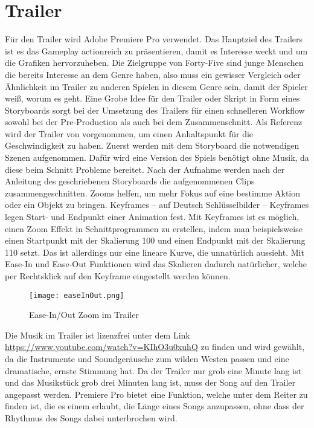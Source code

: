 
\section{Trailer}\label{sec:trailer}

\renewcommand{\kapitelautor}{Autor: Markus Böheim}

Für den Trailer wird Adobe Premiere Pro verwendet.
Das Hauptziel des Trailers
ist es das Gameplay actionreich zu präsentieren, damit es Interesse weckt und um die Grafiken hervorzuheben.
Die Zielgruppe von Forty-Five sind junge Menschen die bereits Interesse an dem Genre haben, also muss ein gewisser
Vergleich oder Ähnlichkeit im Trailer zu anderen Spielen in diesem Genre sein, damit der Spieler weiß, worum es geht.
Eine Grobe Idee für den Trailer oder Skript in Form eines Storyboards sorgt bei der Umsetzung des Trailers für einen
schnelleren Workflow sowohl bei der Pre-Production als auch bei dem Zusammenschnitt.
Als Referenz wird der Trailer von  vorgenommen, um einen Anhaltspunkt für die Geschwindigkeit zu haben.
Zuerst werden mit dem Storyboard die notwendigen Szenen aufgenommen.
Dafür wird eine Version des Spiels benötigt ohne Musik, da diese beim Schnitt Probleme bereitet.
Nach der Aufnahme werden nach der Anleitung des geschriebenen Storyboards die aufgenommenen Clips zusammengeschnitten.
Zooms helfen, um mehr Fokus auf eine bestimme Aktion oder ein Objekt zu bringen.
Keyframes – auf Deutsch Schlüsselbilder – Keyframes legen Start- und Endpunkt einer Animation fest.
Mit Keyframes ist es möglich, einen Zoom Effekt in Schnittprogrammen zu erstellen, indem man beispielsweise einen Startpunkt mit der Skalierung 100 und einen Endpunkt mit der Skalierung 110 setzt.
Das ist allerdings nur eine lineare Kurve, die unnatürlich aussieht.
Mit Ease-In und Ease-Out Funktionen wird das Skalieren dadurch natürlicher, welche per Rechtsklick auf den Keyframe eingestellt werden können.

\begin{figure}[H]
    \centering
    \texttt{[image: easeInOut.png]}
    \caption{Ease-In/Out Zoom im Trailer}
\end{figure}

Die Musik im Trailer ist lizenzfrei unter dem Link \url{https://www.youtube.com/watch?v=KIhO3u0xuhQ} zu finden und wird gewählt, da die Instrumente und Soundgeräusche zum wilden Westen passen und eine dramatische, ernste Stimmung hat. Da der Trailer nur grob eine Minute lang ist und das Musikstück grob drei Minuten lang ist, muss der Song auf den Trailer angepasst werden.
Premiere Pro bietet eine  Funktion, welche unter dem 
Reiter zu finden ist, die es einem erlaubt, die Länge eines Songs anzupassen, ohne dass der Rhythmus des Songs dabei unterbrochen wird.

